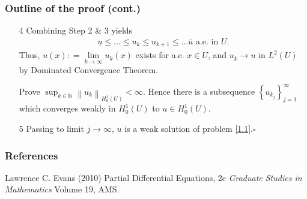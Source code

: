 \documentclass{beamer}
\begin{document}
\begin{frame}
\frametitle{Outline of the proof (cont.)}
\begin{enumerate}
\item[4] Combining Step 2 \& 3 yields \begin{align}
\label{1.34}
\underline{u}\le \ldots \le u_k\le u_{k+1} \le \ldots \overline{u} \mbox{ a.e. in } U.
\end{align}
Thus, $u\left( x \right): = \mathop {\lim }\limits_{k \to \infty } {u_k}\left( x \right)$ exists for a.e. $x\in U$, and $u_k\to u$ in $L^2\left(U\right)$ by Dominated Convergence Theorem.

Prove ${\sup _{k\in \mathbb{N}}}{\left\| {{u_k}} \right\|_{H_0^1\left( U \right)}} < \infty $. Hence there is a subsequence $\left\{ {{u_{{k_j}}}} \right\}_{j = 1}^\infty $ which converges weakly in $H_0^1\left(U\right)$ to $u\in H_0^1\left(U\right)$. 
\item[5] Passing to limit $j\to \infty$, $u$ is a weak solution of problem \eqref{1.1}.\hfill $\square$
\end{enumerate}
 
\end{frame}


\begin{frame}
\frametitle{References}
\footnotesize{
\begin{thebibliography}{99} %
 Lawrence C. Evans (2010) Partial Differential Equations, 2e
\newblock \emph{Graduate Studies in Mathematics} Volume 19, AMS.

\end{thebibliography}
}
\end{frame}


\end{document}
